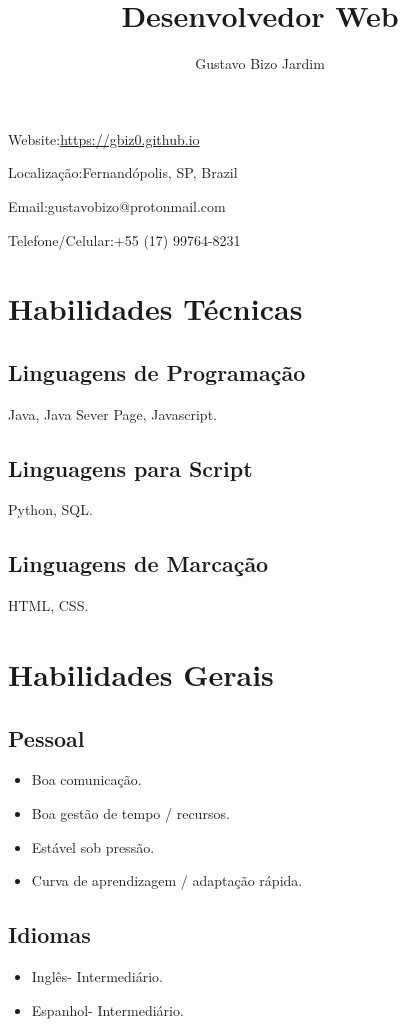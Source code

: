 \documentclass[16pt]{article}
\makeatletter
\renewcommand{\maketitle}
{
  \begin{center}
    \Huge\bfseries
    \textsf{\textbf{\thetitle}}

    \setstretch{1.25}
    \Large
    \textsf{\theauthor}
  \end{center}
  \normalsize
  \begin{minipage}[t]{0.5\linewidth}
    Website:\hspace{0.2em}\url{https://gbiz0.github.io}

    Localização:\hspace{0.2em}Fernand\'opolis, SP, Brazil
  \end{minipage}
  \hfill
  \begin{minipage}[t]{0.5\linewidth}
    \hfill
    Email:\hspace{0.2em}gustavobizo@protonmail.com

    \hfill
    Telefone/Celular:\hspace{0.2em}+55 (17) 99764-8231
  \end{minipage}
}
\makeatother
\begin{document}
  \thispagestyle{empty}
  \title{Desenvolvedor Web}
  \author{Gustavo Bizo Jardim}
  \maketitle
  \section{Habilidades Técnicas}
    \begin{minipage}[t]{0.47\linewidth}
      \subsection{Linguagens de Programação}
        Java, Java Sever Page, Javascript.\\
      \subsection{Linguagens para Script}
        Python, SQL.
    \end{minipage}
    \hfill\vline\hfill
    \begin{minipage}[t]{0.5\linewidth}
      \subsection{Linguagens de Marcação}
        HTML, CSS.\\
    \end{minipage}
  \section{Habilidades Gerais}
    \begin{minipage}[t]{0.47\linewidth}
      \subsection{Pessoal}
        \begin{itemize}
          \item{Boa comunicação.}
          \item{Boa gestão de tempo / recursos.}
          \item{Estável sob pressão.}
          \item{Curva de aprendizagem / adaptação rápida.}
        \end{itemize}
    \end{minipage}
    \hfill\vline\hfill
    \begin{minipage}[t]{0.5\linewidth}
      \subsection{Idiomas}
        \begin{itemize}
          \item{Inglês\hspace{2em}- Intermediário.}
          \item{Espanhol\hspace{1.84em}- Intermediário.}
        \end{itemize}
    \end{minipage}
\end{document}

